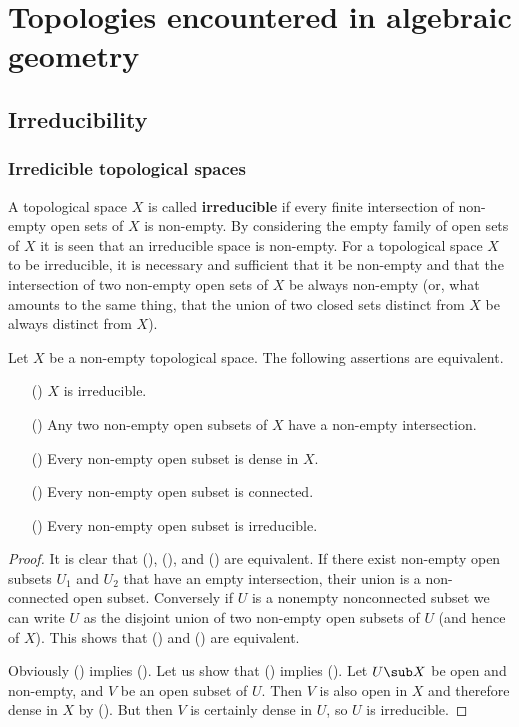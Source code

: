 \chapter{Topologies encountered in algebraic geometry}
\section{Irreducibility}
\subsection{Irredicible topological spaces}
A topological space $X$ is called \textbf{irreducible} if every finite intersection of non-empty open sets of $X$ is non-empty. By considering the empty family of open sets of $X$ it is seen that an irreducible space is non-empty. For a topological space $X$ to be irreducible, it is necessary and sufficient that it be non-empty and that the intersection of two non-empty open sets of $X$ be always non-empty (or, what amounts to the same thing, that the union of two closed sets distinct from $X$ be always distinct from $X$).
\begin{proposition}\label{topo space irreducible iff}
Let $X$ be a non-empty topological space. The following assertions are
equivalent.
\begin{itemize}
\item[(\rmnum{1})] $X$ is irreducible.
\item[(\rmnum{2})] Any two non-empty open subsets of $X$ have a non-empty intersection.
\item[(\rmnum{3})] Every non-empty open subset is dense in $X$.
\item[(\rmnum{4})] Every non-empty open subset is connected.
\item[(\rmnum{5})] Every non-empty open subset is irreducible.
\end{itemize}
\end{proposition}
\begin{proof}
It is clear that (), (), and () are equivalent. If there exist non-empty open subsets $U_1$ and $U_2$ that have an empty intersection, their union is a non-connected open subset. Conversely if $U$ is a nonempty nonconnected subset we can write $U$ as the disjoint union of two non-empty open subsets of $U$ (and hence of $X$). This shows that () and () are equivalent.\par
Obviously () implies (). Let us show that () implies (). Let $U\sub X$ be open and non-empty, and $V$ be an open subset of $U$. Then $V$ is also open in $X$ and therefore dense in $X$ by (). But then $V$ is certainly dense in $U$, so $U$ is irreducible.
\end{proof}
